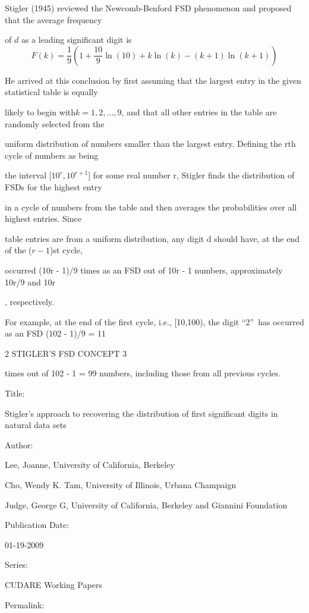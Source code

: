 \documentclass[titlepage,fleqn]{article}%
\begin{document}
Stigler (1945) reviewed the Newcomb-Benford FSD phenomenon and proposed that
the average frequency

of $d$ as a leading significant digit is
\[
F(k)=\frac{1}{9}\left(  1+\frac{10}{9}\ln(10)+k\ln(k)-(k+1)\ln(k+1)\right)
\]


He arrived at this conclusion by first assuming that the largest entry in the
given statistical table is equally

likely to begin with$k=1,2,...,9$, and that all other entries in the table are
randomly selected from the

uniform distribution of numbers smaller than the largest entry. Defining the
rth cycle of numbers as being

the interval [$10^{r},10^{r+1}$] for some real number r, Stigler finds the
distribution of FSDs for the highest entry

in a cycle of numbers from the table and then averages the probabilities over
all highest entries. Since

table entries are from a uniform distribution, any digit d should have, at the
end of the ($r-1$)st cycle,

occurred (10r - 1)/9 times as an FSD out of 10r - 1 numbers, approximately
10r/9 and 10r

, respectively.

For example, at the end of the first cycle, i.e., [10,100), the digit
\textquotedblleft2\textquotedblright\ has occurred as an FSD (102 - 1)/9 = 11

2 STIGLER'S FSD CONCEPT 3

times out of 102 - 1 = 99 numbers, including those from all previous cycles.

\bigskip

Title:

Stigler's approach to recovering the distribution of first significant digits
in natural data sets

Author:

Lee, Joanne, University of California, Berkeley

Cho, Wendy K. Tam, University of Illinois, Urbana Champaign

Judge, George G, University of California, Berkeley and Giannini Foundation

Publication Date:

01-19-2009

Series:

CUDARE Working Papers

Permalink:
\end{document}
